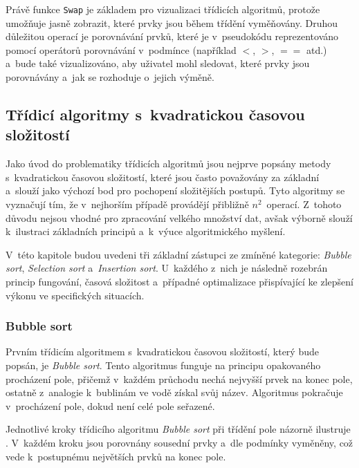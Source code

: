 \begin{listing}[ht]
    
    \caption{Pseudokód pomocné funkce pro výměnu dvou prvků}
    \label{lst:swap}
\end{listing}

Právě funkce \texttt{Swap} je základem pro vizualizaci třídicích algoritmů, protože umožňuje jasně zobrazit, které prvky jsou během třídění vyměňovány.
Druhou důležitou operací je porovnávání prvků, které je v~pseudokódu reprezentováno pomocí operátorů porovnávání v~podmínce (například $<$, $>$, $==$ atd.) a~bude také vizualizováno, aby uživatel mohl sledovat, které prvky jsou porovnávány a~jak se rozhoduje o~jejich výměně.~\cite{sedgewick}

\subsection{Třídicí algoritmy s~kvadratickou časovou složitostí}
\label{subsec:quadratic_algorithms}

Jako úvod do problematiky třídicích algoritmů jsou nejprve popsány metody s~kvadratickou časovou složitostí, které jsou často považovány za základní a~slouží jako výchozí bod pro pochopení složitějších postupů.
Tyto algoritmy se vyznačují tím, že v~nejhorším případě provádějí přibližně $n^2$~operací.
Z~tohoto důvodu nejsou vhodné pro zpracování velkého množství dat, avšak výborně slouží k~ilustraci základních principů a~k~výuce algoritmického myšlení.

V~této kapitole budou uvedeni tři základní zástupci ze zmíněné kategorie: \textit{Bubble sort}, \textit{Selection sort} a~\textit{Insertion sort}.
U~každého z~nich je následně rozebrán princip fungování, časová složitost a~případné optimalizace přispívající ke zlepšení výkonu ve specifických situacích.

\subsubsection*{Bubble sort}

Prvním třídicím algoritmem s~kvadratickou časovou složitostí, který bude popsán, je \textit{Bubble sort}.
Tento algoritmus funguje na principu opakovaného procházení pole, přičemž v~každém průchodu nechá nejvyšší prvek  na konec pole, ostatně z~analogie k~bublinám ve vodě získal svůj název.
Algoritmus pokračuje v~procházení pole, dokud není celé pole seřazené.~\cite{morin2013}

Jednotlivé kroky třídicího algoritmu \textit{Bubble sort} při třídění pole názorně ilustruje .
V~každém kroku jsou porovnány sousední prvky a~dle podmínky vyměněny, což vede k~postupnému  největších prvků na konec pole.

